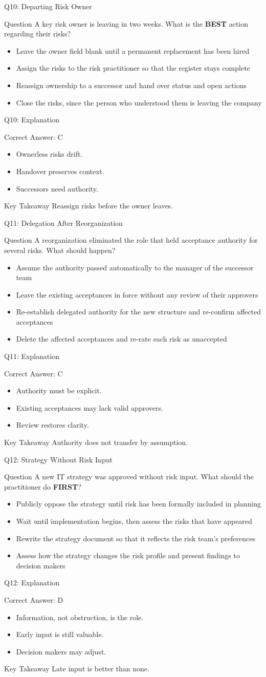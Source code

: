 \documentclass[aspectratio=169]{beamer}
\newcommand{\hq}[7]{%
	\begin{frame}{Q#1: #2}
		\begin{block}{Question}
			#3
		\end{block}
		\begin{itemize}
			#4
		\end{itemize}
	\end{frame}
	\begin{frame}{Q#1: Explanation}
		\begin{block}{Correct Answer: #5}
			\begin{itemize}
				#6
			\end{itemize}
		\end{block}
		\begin{alertblock}{Key Takeaway}
			#7
		\end{alertblock}
	\end{frame}
}
\begin{document}
	\hq{10}{Departing Risk Owner}
	{A key risk owner is leaving in two weeks. What is the \textbf{BEST} action regarding their risks?}
	{\item[\textbf{(A)}] Leave the owner field blank until a permanent replacement has been hired
		\item[\textbf{(B)}] Assign the risks to the risk practitioner so that the register stays complete
		\item[\textbf{(C)}] Reassign ownership to a successor and hand over status and open actions
		\item[\textbf{(D)}] Close the risks, since the person who understood them is leaving the company}
	{C}
	{\item Ownerless risks drift.
		\item Handover preserves context.
		\item Successors need authority.}
	{Reassign risks before the owner leaves.}

	\hq{11}{Delegation After Reorganization}
	{A reorganization eliminated the role that held acceptance authority for several risks. What should happen?}
	{\item[\textbf{(A)}] Assume the authority passed automatically to the manager of the successor team
		\item[\textbf{(B)}] Leave the existing acceptances in force without any review of their approvers
		\item[\textbf{(C)}] Re-establish delegated authority for the new structure and re-confirm affected acceptances
		\item[\textbf{(D)}] Delete the affected acceptances and re-rate each risk as unaccepted}
	{C}
	{\item Authority must be explicit.
		\item Existing acceptances may lack valid approvers.
		\item Review restores clarity.}
	{Authority does not transfer by assumption.}

	\hq{12}{Strategy Without Risk Input}
	{A new IT strategy was approved without risk input. What should the practitioner do \textbf{FIRST}?}
	{\item[\textbf{(A)}] Publicly oppose the strategy until risk has been formally included in planning
		\item[\textbf{(B)}] Wait until implementation begins, then assess the risks that have appeared
		\item[\textbf{(C)}] Rewrite the strategy document so that it reflects the risk team's preferences
		\item[\textbf{(D)}] Assess how the strategy changes the risk profile and present findings to decision makers}
	{D}
	{\item Information, not obstruction, is the role.
		\item Early input is still valuable.
		\item Decision makers may adjust.}
	{Late input is better than none.}
\end{document}
